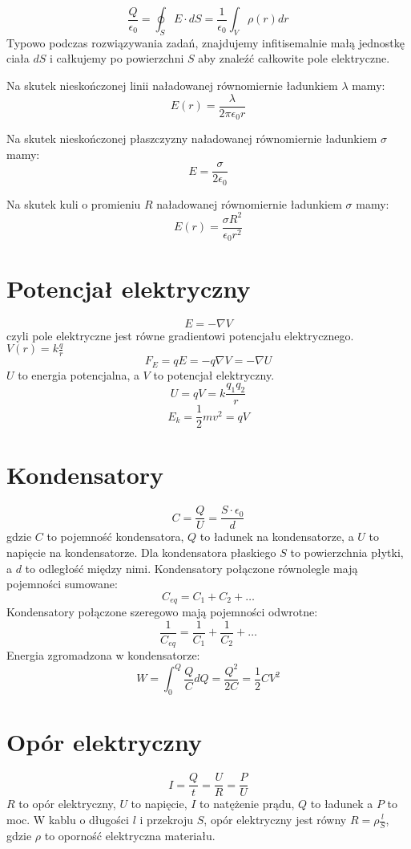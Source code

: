 \documentclass{../konspekt}
\begin{document}
\begin{multicols}{2}
  $$
  \frac{Q}{\epsilon_0} = \oint_S E \cdot dS = \frac{1}{\epsilon_0}
  \int_V \rho(r) dr
  $$
  Typowo podczas rozwiązywania zadań, znajdujemy infitisemalnie małą jednostkę
  ciała $dS$ i całkujemy po powierzchni $S$ aby znaleźć całkowite pole
  elektryczne.

  Na skutek nieskończonej linii naładowanej równomiernie
  ładunkiem $\lambda$ mamy:
  $$
  E(r) = \frac{\lambda}{2\pi\epsilon_0 r}
  $$

  Na skutek nieskończonej płaszczyzny naładowanej równomiernie
  ładunkiem $\sigma$ mamy:
  $$
  E = \frac{\sigma}{2\epsilon_0}
  $$

  Na skutek kuli o promieniu $R$ naładowanej równomiernie
  ładunkiem $\sigma$ mamy:
  $$
  E(r) = \frac{\sigma R^2}{\epsilon_0 r^2}
  $$
  \section{Potencjał elektryczny}

  $$
  E = - \nabla V
  $$
  czyli pole elektryczne jest równe gradientowi potencjału
  elektrycznego. $V(r) = k\frac{q}{r}$
  $$
  F_E = qE = -q \nabla V = - \nabla U
  $$
  $U$ to energia potencjalna, a $V$ to potencjał elektryczny.
  $$
  U = qV = k \frac{q_1 q_2}{r}
  $$
  $$
  E_k = \frac{1}{2} m v^2 = qV
  $$

  \section{Kondensatory}

  $$
  C = \frac{Q}{U} = \frac{S \cdot \epsilon_0}{d}
  $$
  gdzie $C$ to pojemność kondensatora, $Q$ to ładunek na
  kondensatorze, a $U$ to napięcie na kondensatorze. Dla kondensatora
  płaskiego $S$ to powierzchnia płytki, a $d$ to odległość między
  nimi. Kondensatory połączone równolegle mają pojemności sumowane:
  $$
  C_{eq} = C_1 + C_2 + \ldots
  $$
  Kondensatory połączone szeregowo mają pojemności odwrotne:
  $$
  \frac{1}{C_{eq}} = \frac{1}{C_1} + \frac{1}{C_2} + \ldots
  $$
  Energia zgromadzona w kondensatorze:
  $$
  W = \int_{0}^{Q} \frac{Q}{C} dQ = \frac{Q^2}{2C} = \frac{1}{2} C V^2
  $$

  \section{Opór elektryczny}

  $$
  I = \frac{Q}{t} = \frac{U}{R} = \frac{P}{U}
  $$
  $R$ to opór elektryczny, $U$ to napięcie, $I$ to natężenie prądu,
  $Q$ to ładunek a $P$ to moc. W kablu o długości $l$ i przekroju $S$,
  opór elektryczny jest równy $R = \rho \frac{l}{S}$, gdzie $\rho$ to
  oporność elektryczna materiału.


\end{multicols}
\end{document}
